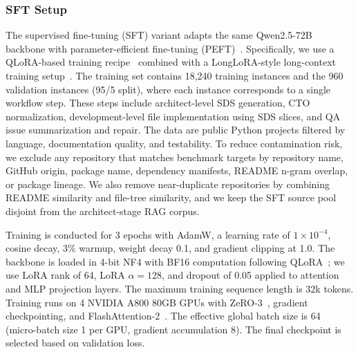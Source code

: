 \documentclass[format=acmsmall, review=false, screen=true]{acmart}
\begin{document}
\subsubsection{SFT Setup}
The supervised fine-tuning (SFT) variant adapts the same Qwen2.5-72B backbone with parameter-efficient fine-tuning (PEFT)~\cite{Qwen2024Qwen25}. Specifically, we use a QLoRA-based training recipe~\cite{Dettmers2023QLoRA} combined with a LongLoRA-style long-context training setup~\cite{Chen2023LongLoRA}. The training set contains 18,240 training instances and the 960 validation instances (95/5 split), where each instance corresponds to a single workflow step. These steps include architect-level SDS generation, CTO normalization, development-level file implementation using SDS slices, and QA issue summarization and repair. The data are public Python projects filtered by language, documentation quality, and testability. To reduce contamination risk, we exclude any repository that matches benchmark targets by repository name, GitHub origin, package name, dependency manifests, README n-gram overlap, or package lineage. We also remove near-duplicate repositories by combining README similarity and file-tree similarity, and we keep the SFT source pool disjoint from the architect-stage RAG corpus.

Training is conducted for 3 epochs with AdamW, a learning rate of $1\times10^{-4}$, cosine decay, 3\% warmup, weight decay 0.1, and gradient clipping at 1.0. The backbone is loaded in 4-bit NF4 with BF16 computation following QLoRA~\cite{Dettmers2023QLoRA}; we use LoRA rank of 64, LoRA $\alpha{=}128$, and dropout of 0.05 applied to attention and MLP projection layers. The maximum training sequence length is 32k tokens. Training runs on 4 NVIDIA A800 80GB GPUs with ZeRO-3~\cite{Rajbhandari2020ZeRO}, gradient checkpointing, and FlashAttention-2~\cite{Dao2023FlashAttention2}. The effective global batch size is 64 (micro-batch size 1 per GPU, gradient accumulation 8). The final checkpoint is selected based on validation loss.
\end{document}
